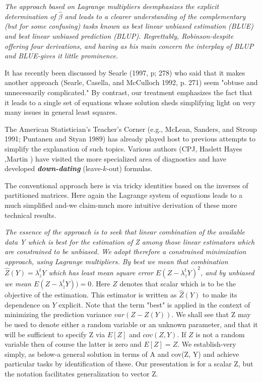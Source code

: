 \documentclass[12pt, a4paper]{report}
\begin{document}
\emph{The approach based on Lagrange multipliers deemphasizes the explicit determination of $\hat{\beta}$ and leads to a clearer understanding of the complementary (but for some confusing) tasks known as best linear unbiased estimation (BLUE) and best linear unbiased prediction (BLUP). Regrettably, Robinson-despite offering four derivations, and having as his main concern the interplay of BLUP and BLUE-gives it little prominence.}

It has recently been discussed by Searle (1997, p; 278) who said that it makes another approach (Searle, Casella, and McCulloch 1992, p. 271) seem "obtuse and unnecessarily complicated." By contrast, our treatment emphasizes the fact that it leads to a single set of equations whose solution sheds simplifying light on very many issues in general least squares.

The American Statistician's Teacher's Corner (e.g., McLean, Sanders, and Stroup 1991; Puntanen and Styan 1989) has already played host to previous attempts to simplify the explanation of such topics. Various authors (CPJ, Haslett Hayes ,Martin ) have visited the more specialized area of diagnostics and have developed \textbf{\emph{down-dating}} (leave-$k$-out) formulas.

The conventional approach here is via tricky identities based on the inverses of partitioned matrices. Here again the Lagrange system of equations leads to a much simplified and-we claim-much more intuitive derivation of these more technical results.


\emph{
	The essence of the approach is to seek that linear combination of the available data Y which is best for the
	estimation of Z among those linear estimators which are constrained to be unbiased. We adopt therefore a constrained minimization approach, using Lagrange multipliers. By best we mean that combination $\hat{Z}(Y) = \lambda_{z}^{t}Y$ which has least mean square error $E( Z- \lambda_{z}^{t}Y)^2$, and by unbiased we mean $E( Z- \lambda_{z}^{t}Y)) = 0$. }
Here $Z$ denotes that scalar which is to be the objective of the estimation. This estimator is written as $\hat{Z}(Y)$ to make its dependence on $Y$ explicit. Note that the term "best" is applied in the context of minimizing the prediction variance $var(Z - Z(Y))$. We shall see that Z may be used to denote either a random variable or an unknown parameter, and that it will be sufficient to specify Z via $E[Z]$ and $cov(Z, Y)$. If $Z$ is not a random variable then of course the latter is zero and $E[Z] = Z$. We establish-very simply, as below-a general solution in terms of A and cov(Z, Y) and achieve particular tasks by identification of these. Our presentation is for a scalar Z, but the notation facilitates generalization to vector Z.
\end{document}
